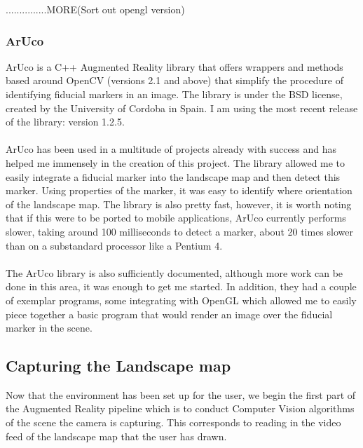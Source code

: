 \documentclass[11pt]{article}
\begin{document}
...............MORE(Sort out opengl version)

\subsubsection{ArUco}
ArUco is a C++ Augmented Reality library that offers wrappers and methods
based around OpenCV (versions 2.1 and above) that simplify the procedure
of identifying fiducial markers in an image. The library is under the BSD
license, created by the University of Cordoba in Spain. I am using the
most recent release of the library: version 1.2.5.\\
\\
ArUco has been used in a multitude of projects already with success and 
has helped me immensely in the creation of this project. The library 
allowed me to easily integrate a fiducial marker into the landscape map
and then detect this marker. Using properties of the marker, it was easy
to identify where orientation of the landscape map. The library is also 
pretty fast, however, it is worth noting that if this were to be ported
to mobile applications, ArUco currently performs slower, taking
around 100 milliseconds to detect a marker, about 20 times slower than
on a substandard processor like a Pentium 4.\\
\\
The ArUco library is also sufficiently documented, although more work can
be done in this area, it was enough to get me started. In addition, they
had a couple of exemplar programs, some integrating with OpenGL which 
allowed me to easily piece together a basic program that would render
an image over the fiducial marker in the scene.

\subsection{Capturing the Landscape map}
Now that the environment has been set up for the user, we begin the first
part of the Augmented Reality pipeline which is to conduct Computer
Vision algorithms of the scene the camera is capturing. This corresponds to
reading in the video feed of the landscape map that the user has drawn.
\end{document}
